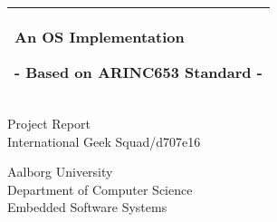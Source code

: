 %
\begin{titlepage}
	\addtolength{\hoffset}{0.5\evensidemargin-0.5\oddsidemargin} %
	\noindent%
	\begin{tabular}{@{}p{\textwidth}@{}}
		\toprule[2pt]
		\midrule
		\vspace{0.2cm}
		\begin{center}
			\Huge{\textbf{
				An OS Implementation
			}}
		\end{center}
		\begin{center}
			\Large{
				- Based on ARINC653 Standard -
			}
		\end{center}
		\vspace{0.2cm}\\
		\midrule
		\toprule[2pt]
	\end{tabular}
	\vspace{4 cm}
	\begin{center}
		{\large
			Project Report
		}\\
		\vspace{0.2cm}
		{\Large
			International Geek Squad/d707e16
		}
	\end{center}
	\vfill
	\begin{center}
		Aalborg University\\
		Department of Computer Science\\
		Embedded Software Systems
	\end{center}
\end{titlepage}
\clearpage
